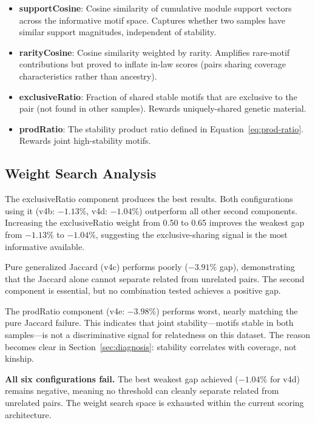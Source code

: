 \documentclass{../yalumba}
\begin{document}
\begin{itemize}
  \item \textbf{supportCosine}: Cosine similarity of cumulative module support
    vectors across the informative motif space.  Captures whether two samples
    have similar support magnitudes, independent of stability.
  \item \textbf{rarityCosine}: Cosine similarity weighted by rarity.  Amplifies
    rare-motif contributions but proved to inflate in-law scores (pairs sharing
    coverage characteristics rather than ancestry).
  \item \textbf{exclusiveRatio}: Fraction of shared stable motifs that are
    exclusive to the pair (not found in other samples).  Rewards
    uniquely-shared genetic material.
  \item \textbf{prodRatio}: The stability product ratio defined in
    Equation~\ref{eq:prod-ratio}.  Rewards joint high-stability motifs.
\end{itemize}

\subsection{Weight Search Analysis}

\begin{keyfinding}
The exclusiveRatio component produces the best results.  Both configurations
using it (v4b: $-1.13\%$, v4d: $-1.04\%$) outperform all other second
components.  Increasing the exclusiveRatio weight from 0.50 to 0.65 improves
the weakest gap from $-1.13\%$ to $-1.04\%$, suggesting the exclusive-sharing
signal is the most informative available.
\end{keyfinding}

\begin{keyfinding}
Pure generalized Jaccard (v4c) performs poorly ($-3.91\%$ gap), demonstrating
that the Jaccard alone cannot separate related from unrelated pairs.  The
second component is essential, but no combination tested achieves a positive gap.
\end{keyfinding}

The prodRatio component (v4e: $-3.98\%$) performs worst, nearly matching
the pure Jaccard failure.  This indicates that joint stability---motifs stable
in both samples---is not a discriminative signal for relatedness on this dataset.
The reason becomes clear in Section~\ref{sec:diagnosis}: stability correlates
with coverage, not kinship.

\begin{limitation}
\textbf{All six configurations fail.}  The best weakest gap achieved ($-1.04\%$
for v4d) remains negative, meaning no threshold can cleanly separate related
from unrelated pairs.  The weight search space is exhausted within the current
scoring architecture.
\end{limitation}
\end{document}
